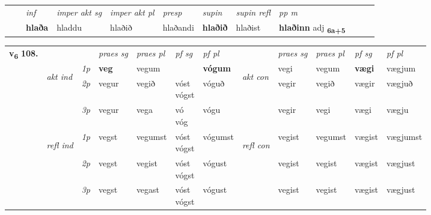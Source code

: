 \begin{tabular}{llllllllllll}
 & & \textit{inf} & \textit{imper akt sg} & \textit{imper akt pl}   & \textit{presp} & \textit{supin} & \textit{supin refl} & \textit{pp m}     \\*
  & & \textbf{hlaða} & hladdu  & hlaðið   & hlaðandi &  \textbf{hlaðið} & hlaðist & \textbf{hlaðinn} adj \textbf{\textsubscript{6a+5}} \\*
\cmidrule{1-12}
\end{tabular}



\begin{tabular}{llllllllllll} \toprule
\multirow{4}{*}{{{\textbf{v{\textsubscript{6}}} \Large{\textbf{108.}}}}}  & &   &  \textit{praes sg}  & \textit{praes pl}  &\textit{ pf sg} & \textit{pf pl} &  &  \textit{praes sg}  & \textit{praes pl}  & \textit{pf sg} & \textit{pf pl } \\*
	\cmidrule{4-7} \cmidrule{9-12}
 & \multirow{3}{*}{\begin{turn}{90}\textit{akt ind}\end{turn}} & {\textit{1p}} & \textbf{veg} & vegum    & \textbf{\specialcell{vó\\ vóg}} & \textbf{vógum} & \multirow{3}{*}{\begin{turn}{90}\textit{akt con}\end{turn}} &vegi & vegum & \textbf{vægi} & vægjum\\*
& &  {\textit{2p}} &  vegur  & vegið   & \specialcell{vóst\\ vógst} & vóguð & & vegir & vegið & vægir & vægjuð \\*
& &  {\textit{3p}} & vegur & vega   & \specialcell{vó\\ vóg} & vógu & & vegir & vegi& vægi & vægju  \\*
\cmidrule{4-7} \cmidrule{9-12}
 &\multirow{3}{*}{\begin{turn}{90}\textit{refl ind}\end{turn}} & {\textit{1p}} & vegst & vegumst    & \specialcell{vóst\\ vógst} & vógumst & \multirow{3}{*}{\begin{turn}{90}\textit{refl con}\end{turn}}  &vegist & vegumst & vægist & vægjumst\\*
 &&  {\textit{2p}} &  vegst  & vegist   & \specialcell{vóst\\ vógst} & vógust & &vegist & vegist & vægist & vægjust \\*
& &  {\textit{3p}} & vegst & vegast   & \specialcell{vóst\\ vógst} & vógust & & vegist & vegist& vægist & vægjust  \\*
\cmidrule{4-7} \cmidrule{9-12}
\end{tabular}


